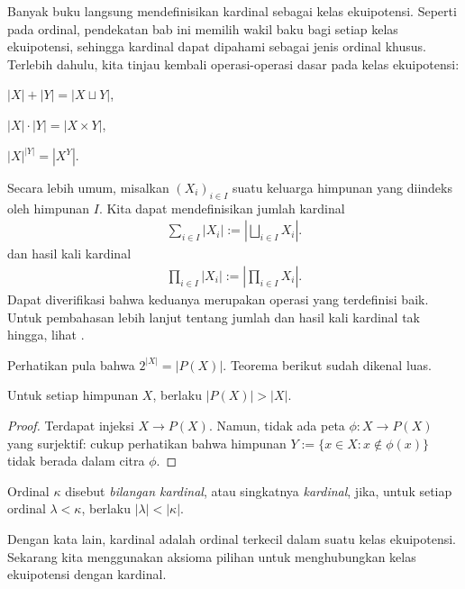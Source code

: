 Banyak buku langsung mendefinisikan kardinal sebagai kelas ekuipotensi. Seperti pada ordinal, pendekatan bab ini memilih wakil baku bagi setiap kelas ekuipotensi, sehingga kardinal dapat dipahami sebagai jenis ordinal khusus. Terlebih dahulu, kita tinjau kembali operasi-operasi dasar pada kelas ekuipotensi:
\begin{compactenum}[(i)]
	\item $|X|+|Y| = |X \sqcup Y|$,
	\item $|X| \cdot |Y| = |X \times Y|$, 
	\item $|X|^{|Y|} = |X^Y|$.
\end{compactenum}
Secara lebih umum, misalkan $(X_i)_{i \in I}$ suatu keluarga himpunan yang diindeks oleh himpunan $I$. Kita dapat mendefinisikan jumlah kardinal
\begin{gather}\label{eqn:cardinal-infinite-sum}
	\sum_{i \in I} |X_i| := \left\lvert \bigsqcup_{i \in I} X_i \right\rvert.
\end{gather}
dan hasil kali kardinal
\begin{gather}\label{eqn:cardinal-infinite-prod}
	\prod_{i \in I} |X_i| := \left\lvert \prod_{i \in I} X_i \right\rvert.
\end{gather}
Dapat diverifikasi bahwa keduanya merupakan operasi yang terdefinisi baik. Untuk pembahasan lebih lanjut tentang jumlah dan hasil kali kardinal tak hingga, lihat \cite[pp.52-55]{Je03}.

Perhatikan pula bahwa $2^{|X|} = |P(X)|$. Teorema berikut sudah dikenal luas.

\begin{theorem}[Cantor]\label{prop:Cantor}
	Untuk setiap himpunan $X$, berlaku $|P(X)| > |X|$.
\end{theorem}
\begin{proof}
	Terdapat injeksi $X \to P(X)$. Namun, tidak ada peta $\phi: X \to P(X)$ yang surjektif: cukup perhatikan bahwa himpunan $Y := \{x \in X : x \notin \phi(x) \}$ tidak berada dalam citra $\phi$.
\end{proof}

\begin{definition}
	Ordinal $\kappa$ disebut \emph{bilangan kardinal}, atau singkatnya \emph{kardinal}, jika, untuk setiap ordinal $\lambda < \kappa$, berlaku $|\lambda| < |\kappa|$.
\end{definition}
Dengan kata lain, kardinal adalah ordinal terkecil dalam suatu kelas ekuipotensi. Sekarang kita menggunakan aksioma pilihan untuk menghubungkan kelas ekuipotensi dengan kardinal.

